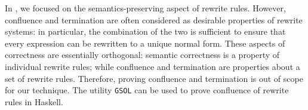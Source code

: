 In \Rulecheck, we focused on the semantics-preserving aspect of rewrite rules.
However, confluence and termination are often considered as desirable properties
of rewrite systems: in particular, the combination of the two is sufficient to
ensure that every expression can be rewritten to a unique normal form. These
aspects of correctness are essentially orthogonal: semantic correctness is a
property of individual rewrite rules; while confluence and termination are
properties about a set of rewrite rules. Therefore, proving confluence and
termination is out of scope for our technique. The utility
\texttt{GSOL}\cite{hamana2022gsol} can be used to prove confluence of rewrite
rules in Haskell.
